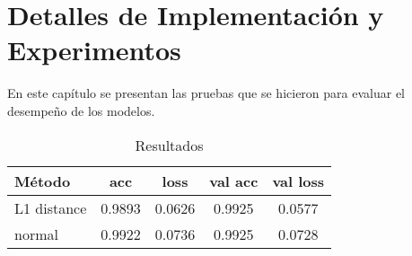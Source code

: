 \chapter{Detalles de Implementación y Experimentos}\label{chapter:implementation}

En este capítulo se presentan las pruebas que se hicieron para evaluar
 el desempeño de los modelos. 

\begin{table}[ht]
    \centering
    \caption{Resultados}
    \begin{tabular}{lcccc}
        \toprule
        \textbf{Método} & \textbf{acc} & \textbf{loss} & \textbf{val acc}  & \textbf{val loss} \\
        \midrule
        L1 distance  &  0.9893 &  0.0626 & 0.9925 & 0.0577 \\
        normal & 0.9922 & 0.0736 & 0.9925 & 0.0728 \\
        \bottomrule
    \end{tabular}
\end{table}
